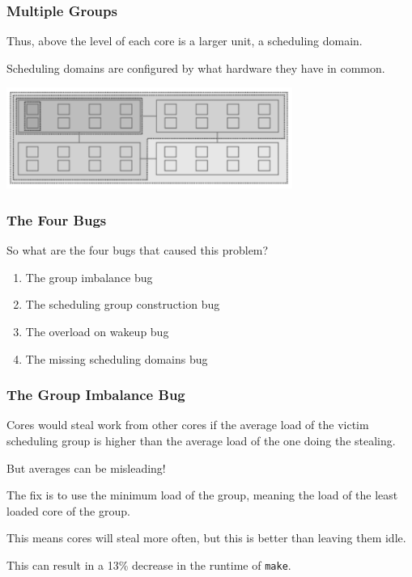 \begin{frame}
\frametitle{Multiple Groups}

Thus, above the level of each core is a larger unit, a scheduling domain. 

Scheduling domains are configured by what hardware they have in common.

\begin{center}
	\includegraphics[width=0.7\textwidth]{images/wastedcores.png}\\
\end{center}

\end{frame}



\begin{frame}
\frametitle{The Four Bugs}

So what are the four bugs that caused this problem?
\begin{enumerate}
	\item The group imbalance bug
	\item The scheduling group construction bug
	\item The overload on wakeup bug
	\item The missing scheduling domains bug
\end{enumerate}

\end{frame}



\begin{frame}
\frametitle{The Group Imbalance Bug}

Cores would steal work from other cores if the average load of the victim scheduling group is higher than the average load of the one doing the stealing. 

But averages can be misleading! 

The fix is to use the minimum load of the group, meaning the load of the least loaded core of the group. 

This means cores will steal more often, but this is better than leaving them idle. 

This can result in a 13\% decrease in the runtime of \texttt{make}.

\end{frame}



